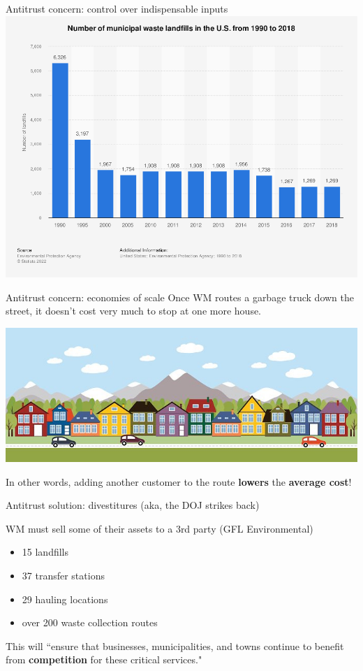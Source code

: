 \documentclass{beamer}
\begin{document}
\begin{frame}{Antitrust concern: control over indispensable inputs}
\includegraphics[width = \textwidth]{images/landfills.png}
\end{frame}

\begin{frame}{Antitrust concern: economies of scale}
Once WM routes a garbage truck down the street, it doesn't cost very much to stop at one more house. \vspace{1em}

\includegraphics[width = \textwidth]{images/streethouses.jpg}
\vspace{.1em}

In other words, adding another customer to the route \textbf{lowers} the \textbf{average cost}!
\end{frame}

\begin{frame}{Antitrust solution: divestitures (aka, the DOJ strikes back)} 

WM must sell some of their assets to a 3rd party (GFL Environmental)
\begin{itemize}
\item 15 landfills
\item 37 transfer stations
\item 29 hauling locations
\item over 200 waste collection routes
\end{itemize}
\vspace{2em}

This will ``ensure that businesses, municipalities, and towns continue to benefit from \textbf{competition} for these critical services."
\end{frame}
\end{document}
